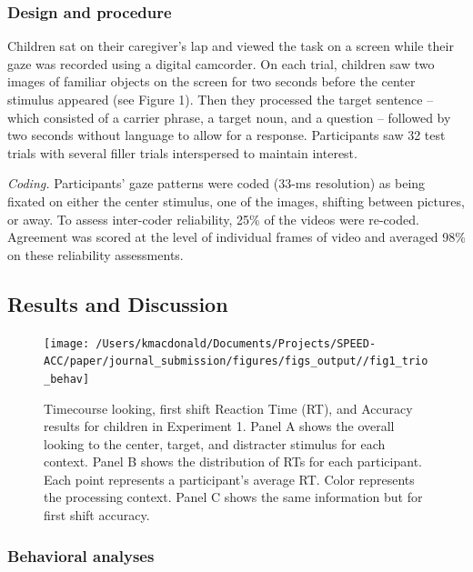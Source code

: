 \documentclass[english,floatsintext,man]{apa6}
\begin{document}
\hypertarget{design-and-procedure}{%
\subsubsection{Design and procedure}\label{design-and-procedure}}

Children sat on their caregiver's lap and viewed the task on a screen
while their gaze was recorded using a digital camcorder. On each trial,
children saw two images of familiar objects on the screen for two
seconds before the center stimulus appeared (see Figure 1). Then they
processed the target sentence -- which consisted of a carrier phrase, a
target noun, and a question -- followed by two seconds without language
to allow for a response. Participants saw 32 test trials with several
filler trials interspersed to maintain interest.

\emph{Coding.} Participants' gaze patterns were coded (33-ms resolution)
as being fixated on either the center stimulus, one of the images,
shifting between pictures, or away. To assess inter-coder reliability,
25\% of the videos were re-coded. Agreement was scored at the level of
individual frames of video and averaged 98\% on these reliability
assessments.

\hypertarget{results-and-discussion}{%
\subsection{Results and Discussion}\label{results-and-discussion}}

\begin{figure}[!ht]

{\centering \texttt{[image: /Users/kmacdonald/Documents/Projects/SPEED-ACC/paper/journal\_submission/figures/figs\_output//fig1\_trio\_behav]} 

}

\caption{Timecourse looking, first shift Reaction Time (RT), and Accuracy results for children in Experiment 1. Panel A shows the overall looking to the center, target, and distracter stimulus for each context. Panel B shows the distribution of RTs for each participant. Each point represents a participant's average RT. Color represents the processing context. Panel C shows the same information but for first shift accuracy.}\label{fig:speed-acc-trio-plot}
\end{figure}

\hypertarget{behavioral-analyses}{%
\subsubsection{Behavioral analyses}\label{behavioral-analyses}}
\end{document}

